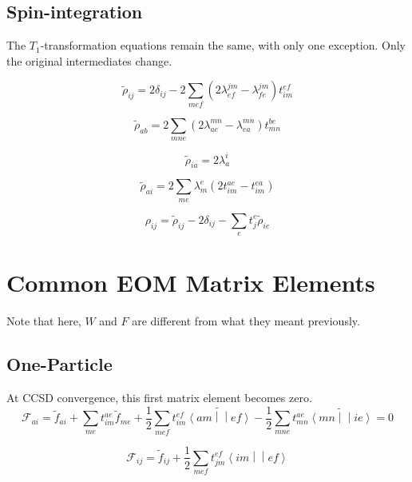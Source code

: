 \documentclass{article}
\newcommand{\tei}[2]{\left<{#1}\middle|\middle|{#2}\right>}
\begin{document}
\subsection{Spin-integration}

The $T_1$-transformation equations remain the same, with only one exception. Only the original intermediates change.

\begin{equation}
  \tilde{\rho}_{ij} = 2\delta_{ij} - 2\sum_{mef}\left(2\lambda_{ef}^{jm} - \lambda_{fe}^{jm}\right)t_{im}^{ef}
\end{equation}

\begin{equation}
  \tilde{\rho}_{ab} = 2\sum_{mne}\left(2\lambda_{ae}^{mn} - \lambda_{ea}^{mn}\right)t_{mn}^{be}
\end{equation}

\begin{equation}
  \tilde{\rho}_{ia} = 2\lambda_a^i
\end{equation}

\begin{equation}
  \tilde{\rho}_{ai} = 2\sum_{me}\lambda_m^e\left(2t_{im}^{ae} - t_{im}^{ea}\right)
\end{equation}

\begin{equation}
  \rho_{ij} = \tilde{\rho}_{ij} - 2\delta_{ij} - \sum_et_j^e\tilde{\rho}_{ie}
\end{equation}

\section{Common EOM Matrix Elements}

Note that here, $W$ and $F$ are different from what they meant previously.

\subsection{One-Particle}

At CCSD convergence, this first matrix element becomes zero.
\begin{equation}
  \mathcal{F}_{ai} = \tilde{f}_{ai} + \sum_{me}t_{im}^{ae}\tilde{f}_{me} + \frac{1}{2}\sum_{mef}t_{im}^{ef}\widetilde{\tei{am}{ef}} - \frac{1}{2}\sum_{mne}t_{mn}^{ae}\widetilde{\tei{mn}{ie}} = 0
\end{equation}

\begin{equation}
  \mathcal{F}_{ij} = \tilde{f}_{ij} + \frac{1}{2}\sum_{mef}t_{jm}^{ef}\tei{im}{ef}
\end{equation}
\end{document}
